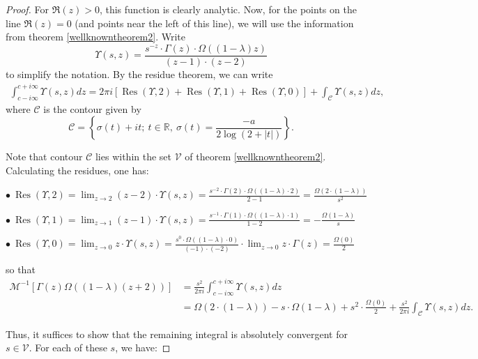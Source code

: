 \documentclass[10pt,a4paper]{amsart}
\newcommand{\R}{\mathbb{R}}
\DeclareMathOperator{\Res}{Res}
\newcommand{\difrac}{\displaystyle \frac}
\newcommand{\diint}{\displaystyle \int}
\newcommand{\dilim}{\displaystyle \lim}
\begin{document}
\begin{proof}
For $\Re(z) > 0$, this function is clearly analytic. Now, for the points on the line $\Re(z) = 0$ (and points near the left of this line), we will use the information from theorem \ref{wellknowntheorem2}. Write $$\Upsilon(s, z) = \difrac{s^{-z} \cdot \Gamma(z) \cdot \Omega((1 - \lambda)z)}{(z - 1) \cdot (z - 2)}$$ to simplify the notation. By the residue theorem, we can write \begin{equation*} \begin{split} \diint_{c - i\infty}^{c + i\infty} \Upsilon(s, z) dz = 2\pi i [\Res(\Upsilon, 2) + \Res(\Upsilon, 1) + \Res(\Upsilon, 0)] + \diint_{\mathcal{C}} \Upsilon(s, z) dz, \end{split} \end{equation*} where $\mathcal{C}$ is the contour given by $$\mathcal{C} = \left\{\sigma(t) + it; \ t \in \R, \ \sigma(t) = \frac{-a}{2\log(2 + |t|)}\right\}.$$

Note that contour $\mathcal{C}$ lies within the set $\mathcal{V}$ of theorem \ref{wellknowntheorem2}. Calculating the residues, one has: 

\noindent $\bullet \ \Res(\Upsilon, 2) = \dilim_{z \to 2} (z - 2) \cdot \Upsilon(s, z) = \difrac{s^{-2} \cdot \Gamma(2) \cdot \Omega((1 - \lambda) \cdot 2)}{2 - 1} = \difrac{\Omega(2 \cdot (1 - \lambda))}{s^2}$

\noindent $\bullet \ \Res(\Upsilon, 1) = \dilim_{z \to 1} (z - 1) \cdot \Upsilon(s, z) = \difrac{s^{-1} \cdot \Gamma(1) \cdot \Omega((1 - \lambda) \cdot 1)}{1 - 2} = -\difrac{\Omega(1 - \lambda)}{s}$

\noindent $\bullet \ \Res(\Upsilon, 0) = \dilim_{z \to 0} z \cdot \Upsilon(s, z) = \difrac{s^0 \cdot \Omega((1 - \lambda) \cdot 0)}{(-1) \cdot (-2)} \cdot \dilim_{z \to 0} z \cdot \Gamma(z) = \difrac{\Omega(0)}{2}$

\noindent so that \begin{equation*} \begin{split} \mathscr{M}^{-1}[\Gamma(z) \Omega((1 - \lambda)(z + 2))] & = \difrac{s^2}{2\pi i} \diint_{c - i\infty}^{c + i\infty} \Upsilon(s, z) dz \\ & = \Omega(2 \cdot (1 - \lambda)) - s \cdot \Omega(1 - \lambda) + s^2 \cdot \difrac{\Omega(0)}{2} + \difrac{s^2}{2\pi i} \diint_{\mathcal{C}} \Upsilon(s, z) dz. \end{split} \end{equation*}

Thus, it suffices to show that the remaining integral is absolutely convergent for $s \in \mathcal{V}$. For each of these $s$, we have:


\end{proof}
\end{document}
